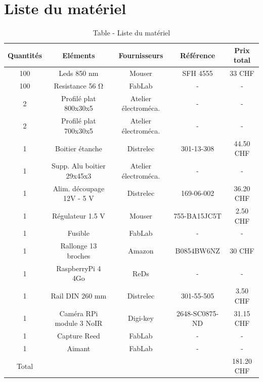 \documentclass[
    iai, %
    eai, %
]{heig-tb}
\begin{document}
\chapter{Liste du matériel}
\begin{table}[H]
    \begin{center}
        \caption{Table - Liste du matériel}
        \begin{tabular}{|c|c|c|c|c|}
            Quantités & Eléments                  & Fournisseurs         & Référence      & Prix total \\ \hline
            100       & Leds 850 nm               & Mouser               & SFH 4555       & 33 CHF     \\
            100       & Resistance 56 \si{\ohm}   & FabLab               & -              & -          \\
            2         & Profilé plat 800x30x5     & Atelier électroméca. & -              & -          \\
            2         & Profilé plat 700x30x5     & Atelier électroméca. & -              & -          \\
            1         & Boitier étanche           & Distrelec            & 301-13-308     & 44.50 CHF  \\
            1         & Supp. Alu boitier 29x45x3 & Atelier électroméca. & -              & -          \\
            1         & Alim. découpage 12V - 5 V & Distrelec            & 169-06-002     & 36.20 CHF  \\
            1         & Régulateur 1.5 V          & Mouser               & 755-BA15JC5T   & 2.50 CHF   \\
            1         & Fusible                   & FabLab               & -              & -          \\
            1         & Rallonge 13 broches       & Amazon               & B0854BW6NZ     & 30 CHF     \\
            1         & RaspberryPi 4 4Go         & ReDs                 & -              & -          \\
            1         & Rail DIN 260 mm           & Distrelec            & 301-55-505     & 3.50 CHF   \\
            1         & Caméra RPi module 3 NoIR  & Digi-key             & 2648-SC0875-ND & 31.15 CHF  \\
            1         & Capture Reed              & FabLab               & -              & -          \\
            1         & Aimant                    & FabLab               & -              & -          \\ \hline
            Total     &                           &                      &                & 181.20 CHF \\
        \end{tabular}
    \end{center}
\end{table}
\end{document}
